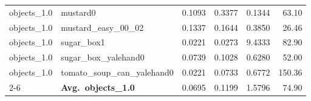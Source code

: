 \begin{longtable}{llrrrr}
  objects_1.0 & mustard0 & 0.1093 & 0.3377 & 0.1344 & 63.10 \\
  objects_1.0 & mustard\_easy\_00\_02 & 0.1337 & 0.1644 & 0.3850 & 26.46 \\
  objects_1.0 & sugar\_box1 & 0.0221 & 0.0273 & 9.4333 & 82.90 \\
  objects_1.0 & sugar\_box\_yalehand0 & 0.0739 & 0.1028 & 0.6280 & 52.00 \\
  objects_1.0 & tomato\_soup\_can\_yalehand0 & 0.0221 & 0.0733 & 0.6772 & 150.36 \\
  \cmidrule{2-6}
  & \textbf{Avg.~objects_1.0} & 0.0695 & 0.1199 & 1.5796 & 74.90 \\
  \midrule
\bottomrule
\end{longtable}